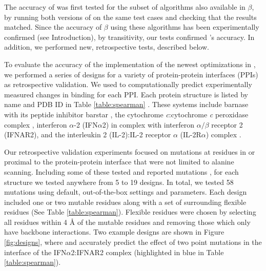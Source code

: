 The accuracy of  was first tested for the subset of algorithms also available in $\beta$, by running both versions of \osprey on the same test cases and checking that the results matched.  Since the accuracy of $\beta$ using these algorithms has been experimentally confirmed (see Introduction), by transitivity, our tests confirmed 's accuracy.  In addition, we performed new, retrospective tests, described below.    

To evaluate the accuracy of the implementation of the newest optimizations in , we performed a series of designs for a variety of protein-protein interfaces (PPIs) as retrospective validation. We used \ks \cite{K*} to computationally predict experimentally measured changes in binding for each PPI. Each protein structure is listed by name and PDB ID in Table \ref{table:spearman} \cite{pdb1x1u,pdb2pcb,pdb3s9d,pdb2b5i}.  These systems include barnase with its peptide inhibitor barstar \cite{binding2barnase,bindingbarnase}, the cytochrome {\it c}:cytochrome {\it c} peroxidase complex \cite{bindingcytc}, interferon $\alpha$-2 (IFN$\alpha$2) in complex with interferon $\alpha/\beta$ receptor 2 (IFNAR2)\cite{bindingifna2}, and the interleukin 2 (IL-2):IL-2 receptor $\alpha$ (IL-2R$\alpha$) complex \cite{bindingil2}.

Our retrospective validation experiments focused on mutations at residues in or proximal to the protein-protein interface that were not limited to alanine scanning. Including some of these tested and reported mutations \cite{binding2barnase,bindingbarnase,bindingcytc,bindingifna2,bindingil2}, for each structure we tested anywhere from 5 to 19 designs. In total, we tested 58 mutations using default, out-of-the-box  settings and parameters. Each design included one or two mutable residues along with a set of surrounding flexible residues (See Table \ref{table:spearman}). Flexible residues were chosen by selecting all residues within 4 {\AA} of the mutable residues and removing those which only have backbone interactions. Two example designs are shown in Figure \ref{fig:designs}, where  and \ks accurately predict the effect of two point mutations in the interface of the IFN$\alpha$2:IFNAR2 complex (highlighted in blue in Table \ref{table:spearman}). 

